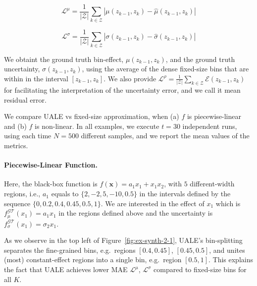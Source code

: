 \documentclass[twoside]{article}
\begin{document}
\begin{equation}
  \label{eq:eval_met_1}
  \mathcal{L}^{\mu} = \frac{1}{|\mathcal{Z}|} \sum_{k \in
  \mathcal{Z}} | \mu(z_{k-1}, z_k) - \hat{\mu}(z_{k-1}, z_k) |
\end{equation}


\begin{equation}
  \label{eq:eval_met_2}
  \mathcal{L}^{\sigma} = \frac{1}{|\mathcal{Z}|} \sum_{k \in
    \mathcal{Z}} | \sigma(z_{k-1}, z_k) - \hat{\sigma}(z_{k-1}, z_k) |
\end{equation}

We obtaint the ground truth bin-effect, \(\mu(z_{k-1}, z_k)\), and the
ground truth uncertainty, \(\sigma(z_{k-1}, z_k)\), using the average
of the dense fixed-size bins that are within in the interval
\([z_{k-1}, z_k]\). We also provide
\(\mathcal{L}^{\rho} = \frac{1}{|\mathcal{Z}|} \sum_{k \in
  \mathcal{Z}} \mathcal{E}(z_{k-1}, z_k) \) for facilitating the
interpretation of the uncertainty error, and we call it mean residual error.


We compare UALE vs fixed-size approximation, when (a) \(f\) is
piecewise-linear and (b) \(f\) is non-linear. In all examples, we
execute \(t = 30\) independent runs, using each time \(N=500\)
different samples, and we report the mean values of the metrics.

\paragraph{Piecewise-Linear Function.}

Here, the black-box function is \(f(\mathbf{x}) = a_1x_1 + x_1x_2\),
with \(5\) different-width regions, i.e., \(a_1\) equals to
\(\{2, -2, 5, -10, 0.5\}\) in the intervals defined by the sequence
\(\{0, 0.2, 0.4, 0.45, 0.5, 1\}\). We are interested in the effect of
\(x_1\) which is \(f^{\mathcal{GT}}_{\mu}(x_1) = a_1x_1\) in the
regions defined above and the uncertainty is
\(f^{\mathcal{GT}}_{\sigma}(x_1) = \sigma_2 x_1\).

As we observe in the top left of Figure~\ref{fig:ex-synth-2-1}, UALE's
bin-splitting separates the fine-grained bins, e.g.~regions
\([0.4, 0.45]\), \([0.45, 0.5]\), and unites (most) constant-effect
regions into a single bin, e.g.~region \([0.5, 1]\). This explains the
fact that UALE achieves lower MAE \(\mathcal{L}^{\mu}\),
\(\mathcal{L}^{\sigma}\) compared to fixed-size bins for all \(K\).
\end{document}
